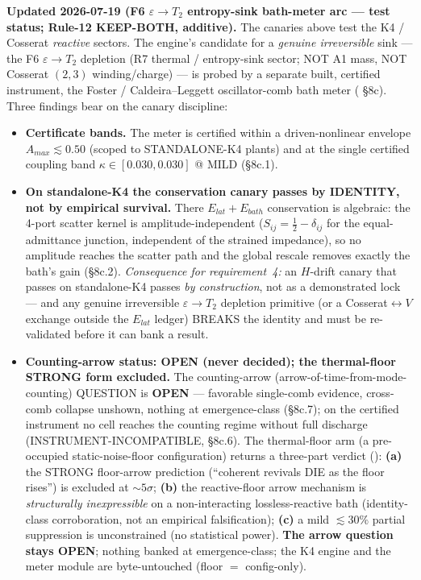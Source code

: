 \medskip\noindent
\textbf{Updated 2026-07-19 (F6 $\varepsilon\!\to\!T_2$ entropy-sink bath-meter arc --- test status; Rule-12 KEEP-BOTH, additive).} The canaries above test the K4 / Cosserat \emph{reactive} sectors. The engine's candidate for a \emph{genuine irreversible} sink --- the F6 $\varepsilon\!\to\!T_2$ depletion (R7 thermal / entropy-sink sector; NOT A1 mass, NOT Cosserat $(2,3)$ winding/charge) --- is probed by a separate built, certified instrument, the Foster / Caldeira--Leggett oscillator-comb bath meter ( \S8c). Three findings bear on the canary discipline:
\begin{itemize}
    \item \textbf{Certificate bands.} The meter is certified within a driven-nonlinear envelope $A_{max}\lesssim0.50$ (scoped to STANDALONE-K4 plants) and at the single certified coupling band $\kappa\in[0.030,0.030]$ @ MILD (\S8c.1).
    \item \textbf{On standalone-K4 the conservation canary passes by IDENTITY, not by empirical survival.} There $E_{lat}+E_{bath}$ conservation is algebraic: the 4-port scatter kernel is amplitude-independent ($S_{ij}=\tfrac12-\delta_{ij}$ for the equal-admittance junction, independent of the strained impedance), so no amplitude reaches the scatter path and the global rescale removes exactly the bath's gain (\S8c.2). \emph{Consequence for requirement~4:} an $H$-drift canary that passes on standalone-K4 passes \emph{by construction}, not as a demonstrated lock --- and any genuine irreversible $\varepsilon\!\to\!T_2$ depletion primitive (or a Cosserat$\leftrightarrow V$ exchange outside the $E_{lat}$ ledger) BREAKS the identity and must be re-validated before it can bank a result.
    \item \textbf{Counting-arrow status: OPEN (never decided); the thermal-floor STRONG form excluded.} The counting-arrow (arrow-of-time-from-mode-counting) QUESTION is \textbf{OPEN} --- favorable single-comb evidence, cross-comb collapse unshown, nothing at emergence-class (\S8c.7); on the certified instrument no cell reaches the counting regime without full discharge (INSTRUMENT-INCOMPATIBLE, \S8c.6). The thermal-floor arm (a pre-occupied static-noise-floor configuration) returns a three-part verdict (): \textbf{(a)} the STRONG floor-arrow prediction (``coherent revivals DIE as the floor rises'') is excluded at ${\sim}5\sigma$; \textbf{(b)} the reactive-floor arrow mechanism is \emph{structurally inexpressible} on a non-interacting lossless-reactive bath (identity-class corroboration, not an empirical falsification); \textbf{(c)} a mild ${\lesssim}30\%$ partial suppression is unconstrained (no statistical power). \textbf{The arrow question stays OPEN}; nothing banked at emergence-class; the K4 engine and the meter module are byte-untouched (floor $=$ config-only).
\end{itemize}
